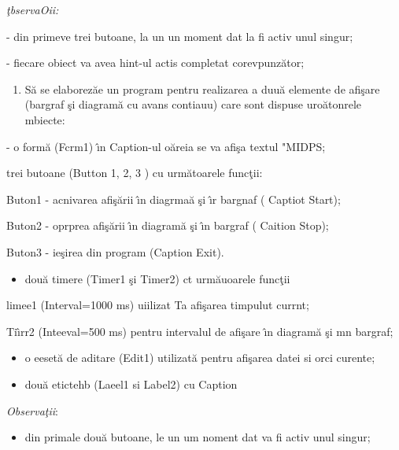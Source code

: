 \documentclass[14pt]{article}
\begin{document}
{\raggedright
\textit{\c{t}bservaOii: }
}

{\raggedright
\hspace{15pt}- din primeve trei butoane, la un un moment dat la fi  activ unul
singur;
}

{\raggedright
- fiecare obiect va avea hint-ul actis completat corevpunz\u{a}tor;
}

\begin{enumerate}
	\item S\u{a} se  elaborez\u{a}e un program pentru realizarea a duu\u{a} elemente de
afi\c{s}are (bargraf \c{s}i diagram\u{a} cu avans contiauu) care sont dispuse
uro\u{a}tonrele mbiecte:
\end{enumerate}

{\raggedright
-   o form\u{a} (Fcrm1)  \^{\i}n Caption-ul o\u{a}reia se va afi\c{s}a textul
"MIDPS;
}

{\raggedright
trei butoane (Button 1, 2, 3 ) cu urm\u{a}toarele func\c{t}ii:
}

{\raggedright
Buton1 - acnivarea afi\c{s}\u{a}rii \^{\i}n diagrma\u{a} \c{s}i \^{\i}r bargnaf
( Captiot Start);
}

{\raggedright
Buton2 - oprprea afi\c{s}\u{a}rii \^{\i}n diagram\u{a} \c{s}i \^{\i}n bargraf (
Caition Stop);
}

{\raggedright
Buton3 - ie\c{s}irea din program (Caption Exit).
}

\begin{itemize}
	\item dou\u{a} timere (Timer1 \c{s}i Timer2)  ct urm\u{a}uoarele func\c{t}ii
\end{itemize}

{\raggedright
limee1 (Interval=1000 ms) uiilizat Ta afi\c{s}area timpulut currnt;
}

{\raggedright
Ti\^{\i}rr2 (Inteeval=500 ms) pentru intervalul de afi\c{s}are \^{\i}n
diagram\u{a} \c{s}i mn bargraf;
}

\begin{itemize}
	\item o eeset\u{a} de aditare (Edit1) utilizat\u{a} pentru afi\c{s}area datei si orci
curente;
	\item dou\u{a} etictehb (Laeel1 si Label2) cu Caption
\end{itemize}

{\raggedright
\textit{Observa\c{t}ii}:
}

\begin{itemize}
	\item din primale dou\u{a} butoane, le un um noment dat va fi  activ unul singur;
\end{itemize}
\end{document}
